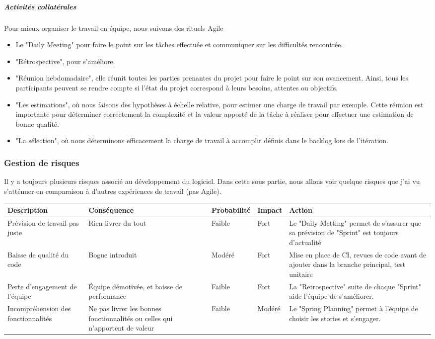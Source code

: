 \subparagraph{Activités collatérales} Pour mieux organiser le travail en équipe, nous suivons des rituels Agile
\begin{itemize}
  \item Le "Daily Meeting" pour faire le point sur les tâches effectuée et communiquer sur les difficultés rencontrée.
  \item "Rétrospective", pour s’améliore.
  \item "Réunion hebdomadaire",  elle réunit toutes les parties prenantes du projet pour faire le point sur son avancement. Ainsi, tous les participants peuvent se rendre compte si l’état du projet correspond à leurs besoins, attentes ou objectifs.
  \item "Les estimations", où nous faisons des hypothèses à échelle relative, pour estimer une charge de travail par exemple. Cette réunion est importante pour déterminer correctement la complexité et la valeur apporté de la tâche à réaliser pour effectuer une estimation de bonne qualité.
  \item "La sélection", où nous déterminons efficacement la charge de travail à accomplir définis dans le backlog lors de l'itération.
\end{itemize}

\subsubsection{Gestion de risques}
Il y a toujours plusieurs risques associé au développement du logiciel. Dans cette sous partie, nous allons voir quelque risques que j'ai vu s'atténuer en comparaison à d'autres expériences de travail (pas Agile). \cite{basile_plessis_2014}
\begin{center}
\begin{tabular}{p{3cm}|p{3cm}|l|l|p{5cm}}
Description & Conséquence & Probabilité & Impact & Action \\ \hline
Prévision de travail pas juste & Rien livrer du tout & Faible & Fort & Le "Daily Metting" permet de s'assurer que sa prévision de "Sprint" est toujours d'actualité \\
Baisse de qualité du code & Bogue introduit & Modéré & Fort & Mise en place de CI, revues de code avant de ajouter dans la branche principal, test unitaire \\
Perte d'engagement de l'équipe & Équipe démotivée, et baisse de performance & Faible & Fort & La "Retrospective" suite de chaque "Sprint" aide l'équipe de s'améliorer. \\
Incompréhension des fonctionnalités & Ne pas livrer les bonnes fonctionnalités ou celles qui n'apportent de valeur & Faible & Modéré & Le "Spring Planning" permet à l'équipe de choisir les stories et s'engager. \\


\end{tabular}
\end{center}
